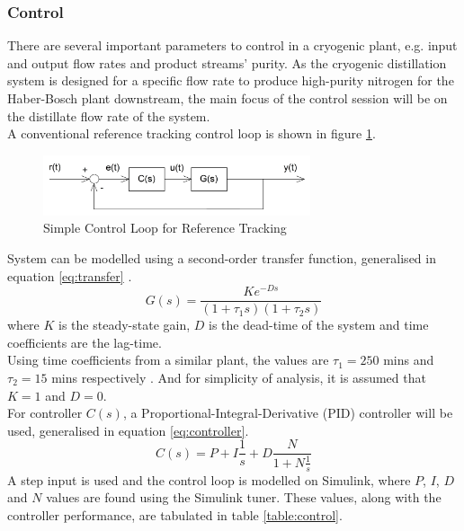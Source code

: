 	\subsubsection{Control} \noindent
    	There are several important parameters to control in a cryogenic plant, e.g. input and output flow rates and product streams' purity. As the cryogenic distillation system is designed for a specific flow rate to produce high-purity nitrogen for the Haber-Bosch plant downstream, the main focus of the control session will be on the distillate flow rate of the system.\\
    	A conventional reference tracking control loop is shown in figure \ref{fig:control_loop}.
    	\begin{figure}[H]
    	    \centering
    	    \includegraphics[width=0.7\textwidth]{control_loop.jpg}
    	    \caption{Simple Control Loop for Reference Tracking}
    	    \label{fig:control_loop}
    	\end{figure}
    	\noindent System can be modelled using a second-order transfer function, generalised in equation \ref{eq:transfer} \citep{control_transfer_function}.
    	\begin{equation}
    	    G(s) = \frac{Ke^{-Ds}}{(1+\tau _1s)(1+\tau _2s)}
    	    \label{eq:transfer}
    	\end{equation}
    	where $K$ is the steady-state gain, $D$ is the dead-time of the system and time coefficients are the lag-time. \\
    	Using time coefficients from a similar plant, the values are $\tau _1 = 250$ mins and $\tau _2 = 15$ mins respectively \citep{control_time_coefficient}. And for simplicity of analysis, it is assumed that $K = 1$ and $D = 0$.\\
    	For controller $C(s)$, a Proportional-Integral-Derivative (PID) controller will be used, generalised in equation \ref{eq:controller}.
    	\begin{equation}
    	    C(s) = P+I\frac{1}{s}+D\frac{N}{1+N\frac{1}{s}}
    	    \label{eq:controller}
    	\end{equation}
    	A step input is used and the control loop is modelled on Simulink, where $P$, $I$, $D$ and $N$ values are found using the Simulink tuner. These values, along with the controller performance, are tabulated in table \ref{table:control}.
